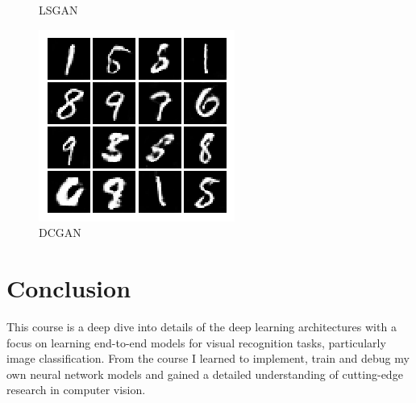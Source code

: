 \documentclass{article} %
\begin{document}
\begin{figure}[htbp]
\begin{minipage}[t]{.33\textwidth}
		\caption{LSGAN}
		\label{fig:ls-origin}
	\end{minipage}
	\begin{minipage}[t]{.33\textwidth}
		\centering
		\includegraphics[width=\textwidth]{dc-gan.png}
		\caption{DCGAN}
		\label{fig:dc-origin}
	\end{minipage}
\end{figure}


\section{Conclusion}
This course is a deep dive into details of the deep learning architectures with a focus on learning end-to-end models for visual recognition tasks, particularly image classification. From the course I learned to implement, train and debug my own neural network models and gained a detailed understanding of cutting-edge research in computer vision. 
\end{document}

